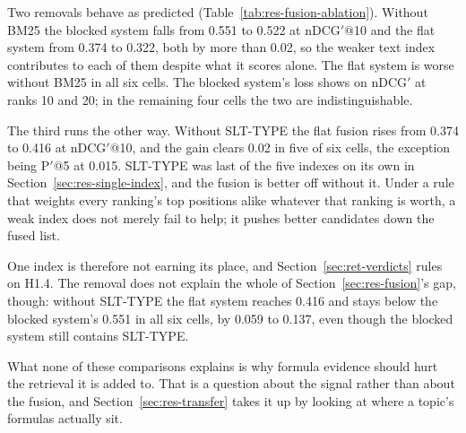 Two removals behave as predicted (Table~\ref{tab:res-fusion-ablation}). Without BM25 the blocked
system falls from 0.551 to 0.522 at nDCG$'$@10 and the flat system from 0.374 to 0.322, both by
more than 0.02, so the weaker text index contributes to each of them despite what it scores
alone. The flat system is worse without BM25 in all six cells. The blocked system's loss shows on
nDCG$'$ at ranks 10 and 20; in the remaining four cells the two are indistinguishable.

The third runs the other way. Without SLT-TYPE the flat fusion rises from 0.374 to 0.416 at
nDCG$'$@10, and the gain clears 0.02 in five of six cells, the exception being P$'$@5 at 0.015.
SLT-TYPE was last of the five indexes on its own in
Section~\ref{sec:res-single-index}, and the fusion is better off without it. Under a rule that weights every ranking's top positions alike whatever that ranking
is worth, a weak index does not merely fail to help; it pushes better candidates down the fused
list.

One index is therefore not earning its place, and Section~\ref{sec:ret-verdicts} rules on H1.4.
The removal does not explain the whole of Section~\ref{sec:res-fusion}'s gap, though: without
SLT-TYPE the flat system reaches 0.416 and stays below the blocked system's 0.551 in all six
cells, by 0.059 to 0.137, even though the blocked system still contains SLT-TYPE.

What none of these comparisons explains is why formula evidence should hurt the retrieval it is
added to. That is a question about the signal rather than about the fusion, and
Section~\ref{sec:res-transfer} takes it up by looking at where a topic's formulas actually sit.

